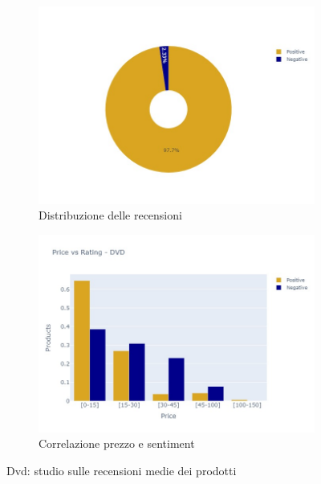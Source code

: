 			\begin{figure} [h]
				\centering
				\begin{subfigure}{0.48\textwidth}
					\includegraphics[width=\textwidth]{Figure/pie_dvd}
					\caption{Distribuzione delle recensioni}
					\label{fig:pie_dvd}
				\end{subfigure}
				\begin{subfigure}{0.48\textwidth}
					\includegraphics[width=\textwidth]{Figure/priceVSrating_dvd}
					\caption{Correlazione prezzo e sentiment}
					\label{fig:priceVSrating_dvd}
				\end{subfigure}
				\caption{Dvd: studio sulle recensioni medie dei prodotti}\label{fig:price_raiting_dvd}
			\end{figure}
		
